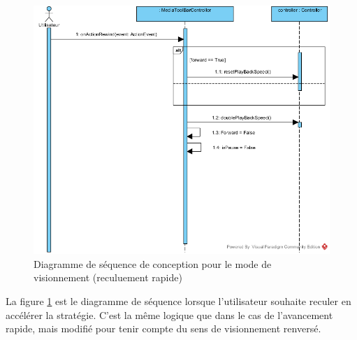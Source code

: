 \begin{figure}[htpb]
    \centering
    \includegraphics[scale=0.5]{fig/dsc_rewind.png}
    \caption{Diagramme de séquence de conception pour le mode de visionnement (reculuement rapide)}
    \label{fig:dsc_view_rewind}
\end{figure}

La figure \ref{fig:dsc_view_rewind} est le diagramme de séquence lorsque l'utilisateur souhaite reculer en accélérer la stratégie.
C'est la même logique que dans le cas de l'avancement rapide, mais modifié pour tenir compte du sens de visionnement renversé.
